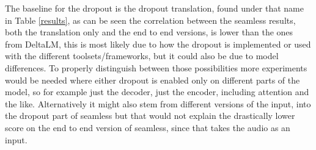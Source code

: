 The baseline for the dropout is the dropout translation, found under that name in Table \autoref{results}, as can be seen the correlation between the seamless results, both the translation only and the end to end versions, is lower than the ones from DeltaLM, this is most likely due to how the dropout is implemented or used with the different toolsets/frameworks, but it could also be due to model differences. To properly distinguish between those possibilities more experiments would be needed where either dropout is enabled only on different parts of the model, so for example just the decoder, just the encoder, including attention and the like. Alternatively it might also stem from different versions of the input, into the dropout part of seamless but that would not explain the drastically lower score on the end to end version of seamless, since that takes the audio as an input. 

